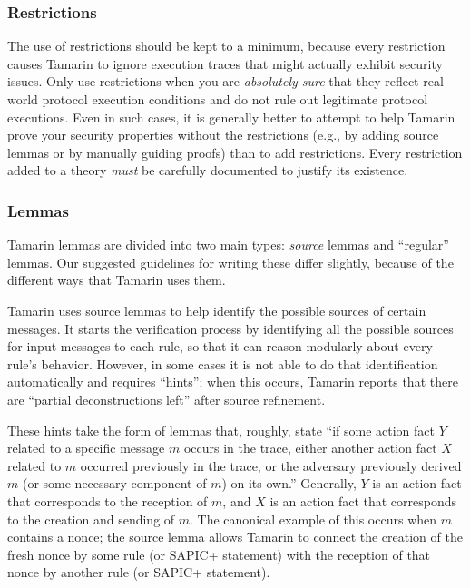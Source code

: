 \subsubsection{Restrictions}

The use of restrictions should be kept to a minimum, because every restriction causes Tamarin to ignore execution traces that might actually exhibit security issues. Only use restrictions when you are \emph{absolutely sure} that they reflect real-world protocol execution conditions and do not rule out legitimate protocol executions. Even in such cases, it is generally better to attempt to help Tamarin prove your security properties without the restrictions (e.g., by adding source lemmas or by manually guiding proofs) than to add restrictions.  Every restriction added to a theory \emph{must} be carefully documented to justify its existence.

\subsubsection{Lemmas}

Tamarin lemmas are divided into two main types: \emph{source} lemmas and ``regular'' lemmas. Our suggested guidelines for writing these differ slightly, because of the different ways that Tamarin uses them.

Tamarin uses source lemmas to help identify the possible sources of certain messages. It starts the verification process by identifying all the possible sources for input messages to each rule, so that it can reason modularly about every rule's behavior. However, in some cases it is not able to do that identification automatically and requires ``hints''; when this occurs, Tamarin reports that there are ``partial deconstructions left'' after source refinement. 

These hints take the form of lemmas that, roughly, state ``if some action fact $Y$ related to a specific message $m$ occurs in the trace, either another action fact $X$ related to $m$ occurred previously in the trace, or the adversary previously derived $m$ (or some necessary component of $m$) on its own.'' Generally, $Y$ is an action fact that corresponds to the reception of $m$, and $X$ is an action fact that corresponds to the creation and sending of $m$. The canonical example of this occurs when $m$ contains a nonce; the source lemma allows Tamarin to connect the creation of the fresh nonce by some rule (or SAPIC+ statement) with the reception of that nonce by another rule (or SAPIC+ statement). 


